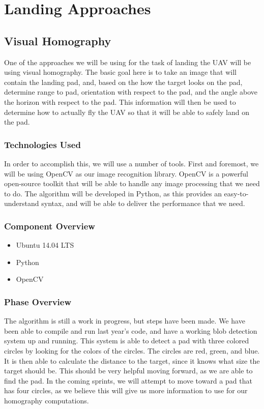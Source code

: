 \section{Landing Approaches}
\subsection{Visual Homography}
One of the approaches we will be using for the task of landing the UAV will be using visual homography. The basic goal here is to take an image that will contain the landing pad, and, based on the how the target looks on the pad, determine range to pad, orientation with respect to the pad, and the angle above the horizon with respect to the pad. This information will then be used to determine how to actually fly the UAV so that it will be able to safely land on the pad.
\subsubsection{Technologies  Used}
In order to accomplish this, we will use a number of tools. First and foremost, we will be using OpenCV as our image recognition library. OpenCV is a powerful open-source toolkit that will be able to handle any image processing that we need to do. The algorithm will be developed in Python, as this provides an easy-to-understand syntax, and will be able to deliver the performance that we need.
\subsubsection{Component  Overview}
\begin{itemize}
	\item Ubuntu 14.04 LTS
	\item Python
	\item OpenCV
\end{itemize}
\subsubsection{Phase Overview}
The algorithm is still a work in progress, but steps have been made. We have been able to compile and run last year's code, and have a working blob detection system up and running. This system is able to detect a pad with three colored circles by looking for the colors of the circles. The circles are red, green, and blue. It is then able to calculate the distance to the target, since it knows what size the target should be. This should be very helpful moving forward, as we are able to find the pad. In the coming sprints, we will attempt to move toward a pad that has four circles, as we believe this will give us more information to use for our homography computations.
